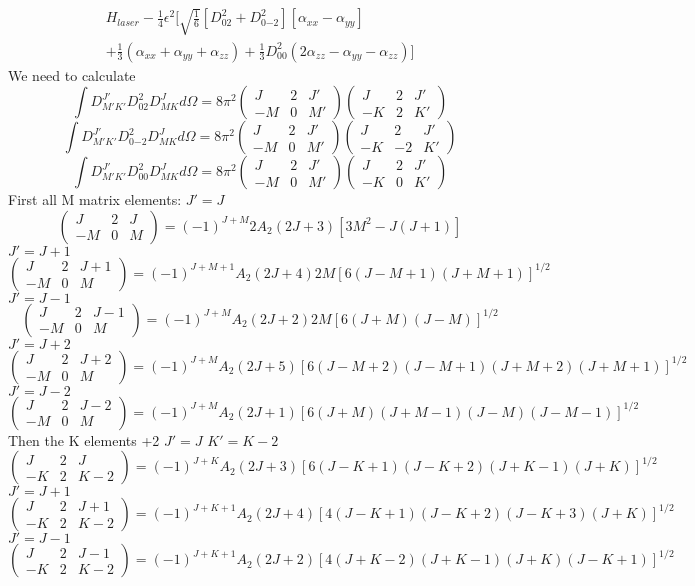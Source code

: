 \documentclass{article}
\newcommand{\D}[3]{D^{#1}_{{#2}{#3}}}%
\newcommand{\wigner}[6]{\begin{pmatrix}{#1}&{#2}&{#3}\\{#4}&{#5}&{#6}\end{pmatrix}}
\begin{document}
\begin{align*}
  H_{laser}-\frac{1}{4}\epsilon^2\Bigg[\sqrt{\frac{1}{6}}[\D{2}{0}{2}+\D{2}{0}{-2}][\alpha_{xx}-\alpha_{yy}]\\ +\frac{1}{3}(\alpha_{xx}+\alpha_{yy}+\alpha_{zz})+\frac{1}{3}\D{2}{0}{0}(2\alpha_{zz}-\alpha_{yy}-\alpha_{zz})\Bigg]
\end{align*}
We need to calculate
\begin{equation*}
  \int \D{J'}{M'}{K'}\D{2}{0}{2}\D{J}{M}{K}d\Omega=8\pi^2\wigner{J}{2}{J'}{-M}{0}{M'}\wigner{J}{2}{J'}{-K}{2}{K'}
\end{equation*}
\begin{equation*}
  \int \D{J'}{M'}{K'}\D{2}{0}{-2}\D{J}{M}{K}d\Omega=8\pi^2\wigner{J}{2}{J'}{-M}{0}{M'}\wigner{J}{2}{J'}{-K}{-2}{K'}
\end{equation*}
\begin{equation*}
  \int \D{J'}{M'}{K'}\D{2}{0}{0}\D{J}{M}{K}d\Omega=8\pi^2\wigner{J}{2}{J'}{-M}{0}{M'}\wigner{J}{2}{J'}{-K}{0}{K'}
\end{equation*}
First all M matrix elements:
$J'=J$
\begin{equation*}
  \wigner{J}{2}{J}{-M}{0}{M}=(-1)^{J+M}2A_2(2J+3)[3M^2-J(J+1)]
\end{equation*}
$J'=J+1$
\begin{equation*}
  \wigner{J}{2}{J+1}{-M}{0}{M}=(-1)^{J+M+1}A_2(2J+4)2M[6(J-M+1)(J+M+1)]^{1/2}
\end{equation*}
$J'=J-1$
\begin{equation*}
  \wigner{J}{2}{J-1}{-M}{0}{M}=(-1)^{J+M}A_2(2J+2)2M[6(J+M)(J-M)]^{1/2}
\end{equation*}
$J'=J+2$
\begin{equation*}
  \wigner{J}{2}{J+2}{-M}{0}{M}=(-1)^{J+M}A_2(2J+5)[6(J-M+2)(J-M+1)(J+M+2)(J+M+1)]^{1/2}
\end{equation*}
$J'=J-2$
\begin{equation*}
  \wigner{J}{2}{J-2}{-M}{0}{M}=(-1)^{J+M}A_2(2J+1)[6(J+M)(J+M-1)(J-M)(J-M-1)]^{1/2}
\end{equation*}
\newpage
Then the K elements +2
 $J'=J$ $K'=K-2$
\begin{equation*}
  \wigner{J}{2}{J}{-K}{2}{K-2}=(-1)^{J+K}A_2(2J+3)[6(J-K+1)(J-K+2)(J+K-1)(J+K)]^{1/2}
\end{equation*}
$J'=J+1$
\begin{equation*}
  \wigner{J}{2}{J+1}{-K}{2}{K-2}=(-1)^{J+K+1}A_2(2J+4)[4(J-K+1)(J-K+2)(J-K+3)(J+K)]^{1/2}
\end{equation*}
$J'=J-1$
\begin{equation*}
  \wigner{J}{2}{J-1}{-K}{2}{K-2}=(-1)^{J+K+1}A_2(2J+2)[4(J+K-2)(J+K-1)(J+K)(J-K+1)]^{1/2}
\end{equation*}
\end{document}
